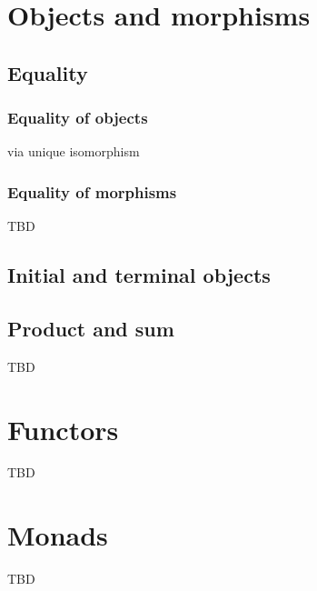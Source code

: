 \chapter{Objects and morphisms}

\section{Equality}

\subsection{Equality of objects}
via unique isomorphism

\subsection{Equality of morphisms}
TBD

\section{Initial and terminal objects}

\section{Product and sum}
TBD

\chapter{Functors}

TBD

\chapter{Monads}

TBD
